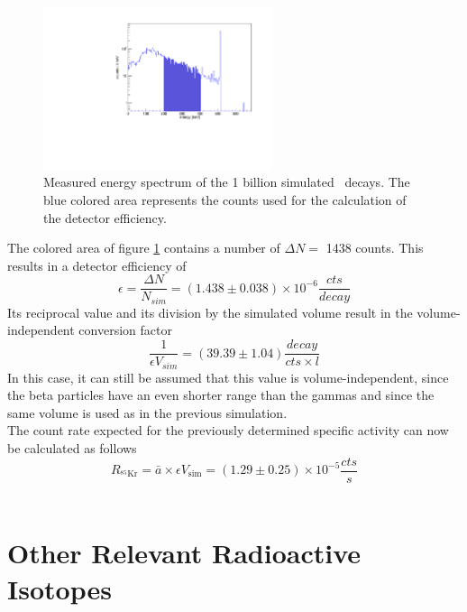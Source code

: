 \documentclass[encoding=utf8,british]{tumphthesis}
\begin{document}
\begin{figure}[t!]
\centering
		\includegraphics[width=0.6\textwidth]{./Bilder/Sim1Phasenraum.pdf}
		\caption{
			Measured energy spectrum of the 1 billion simulated \Kr\ decays. 
			The blue colored area represents the counts used for the calculation of the detector efficiency.
		}
		\label{fig:Sim1Spektrum}
		\vspace{5mm}
\end{figure}


The colored area of figure \ref{fig:Sim1Spektrum} contains a number of $\Delta N =$ 1438 counts.
This results in a detector efficiency of 
\begin{equation*}
\epsilon = \frac{\Delta N}{N_{\unit{sim}}} = (1.438 \pm 0.038) \times 10^{-6} \frac{\unit{cts}}{\unit{decay}}
\end{equation*}
Its reciprocal value and its division by the simulated volume result in the volume-independent conversion factor
\begin{equation*}
\frac{1}{\epsilon V_{\unit{sim}}} = (39.39 \pm 1.04) \frac{\unit{decay}}{\unit{cts \times l}}
\end{equation*}
In this case, it can still be assumed that this value is volume-independent, since the beta particles have an even shorter range than the gammas and since the same volume is used as in the previous simulation.
\\

The count rate expected for the previously determined specific activity can now be calculated as follows
\begin{equation*}
R_{^{85}\mathrm{Kr}} = \bar{a} \times  \epsilon V_{\mathrm{sim}} =  (1.29\pm0.25) \times 10^{-5} \frac{\unit{cts}}{\unit{s}}
\end{equation*}
\\

\section{Other Relevant Radioactive Isotopes}
\label{sec:other}
\end{document}
